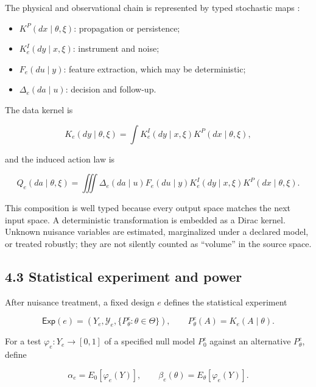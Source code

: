 \documentclass[11pt,a4paper]{article}
\begin{document}
The physical and observational chain is represented by typed stochastic maps \citep{fritz2020,pearl1995}:

\begin{itemize}
\item
  \(K^P(dx\mid\theta,\xi)\): propagation or persistence;
\item
  \(K^I_e(dy\mid x,\xi)\): instrument and noise;
\item
  \(F_e(du\mid y)\): feature extraction, which may be deterministic;
\item
  \(\Delta_e(da\mid u)\): decision and follow-up.
\end{itemize}

The data kernel is

\begin{equation}
K_e(dy\mid\theta,\xi)
=\int K^I_e(dy\mid x,\xi)K^P(dx\mid\theta,\xi),
\end{equation}

and the induced action law is

\begin{equation}
Q_e(da\mid\theta,\xi)
=\iiint \Delta_e(da\mid u)F_e(du\mid y)
K^I_e(dy\mid x,\xi)K^P(dx\mid\theta,\xi).
\end{equation}

This composition is well typed because every output space matches the next input space. A deterministic transformation is embedded as a Dirac kernel. Unknown nuisance variables are estimated, marginalized under a declared model, or treated robustly; they are not silently counted as ``volume'' in the source space.

\subsection{4.3 Statistical experiment and power}\label{43-statistical-experiment-and-power}

After nuisance treatment, a fixed design \(e\) defines the statistical experiment

\begin{equation}
\mathsf{Exp}(e)=\left(Y_e,\mathcal Y_e,\{P^e_\theta:\theta\in\Theta\}\right),
\qquad P^e_\theta(A)=K_e(A\mid\theta).
\end{equation}

For a test \(\varphi_e:Y_e\to[0,1]\) of a specified null model \(P^e_0\) against an alternative \(P^e_\theta\), define

\begin{equation}
\alpha_e=E_0[\varphi_e(Y)],\qquad
\beta_e(\theta)=E_\theta[\varphi_e(Y)].
\end{equation}
\end{document}
